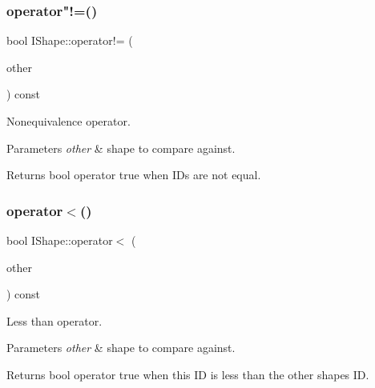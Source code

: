 \mbox{\label{class_i_shape_a1f34ccaa57da81f897bbff476d0ba3ac}} 
\subsubsection{\texorpdfstring{operator"!=()}{operator!=()}}
{\footnotesize\ttfamily bool I\+Shape\+::operator!= (\begin{DoxyParamCaption}\item[{const \mbox{\hyperlink{class_i_shape}{I\+Shape}} \&}]{other }\end{DoxyParamCaption}) const}



Nonequivalence operator. 


\begin{DoxyParams}{Parameters}
{\em other} & shape to compare against. \\
\hline
\end{DoxyParams}
\begin{DoxyReturn}{Returns}
bool operator true when I\+Ds are not equal. 
\end{DoxyReturn}
\mbox{\label{class_i_shape_aea5cdca9613598dbfff8c7d2eb512cea}} 
\subsubsection{\texorpdfstring{operator$<$()}{operator<()}}
{\footnotesize\ttfamily bool I\+Shape\+::operator$<$ (\begin{DoxyParamCaption}\item[{const \mbox{\hyperlink{class_i_shape}{I\+Shape}} \&}]{other }\end{DoxyParamCaption}) const}



Less than operator. 


\begin{DoxyParams}{Parameters}
{\em other} & shape to compare against. \\
\hline
\end{DoxyParams}
\begin{DoxyReturn}{Returns}
bool operator true when this ID is less than the other shape\textquotesingle{}s ID. 
\end{DoxyReturn}
\mbox{\label{class_i_shape_a7cb22874dc0be6b43b79a94c88c3578a}} 
